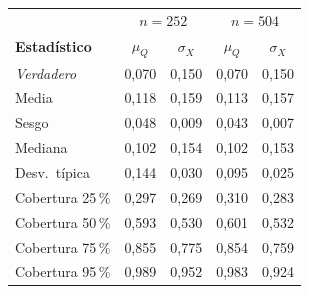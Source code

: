 {\footnotesize
\renewcommand{\arraystretch}{1.18}
\begin{tabular}{l|cc|cc}
\hline
\multicolumn{1}{c}{} & \multicolumn{2}{c}{$n=252$} & \multicolumn{2}{c}{$n=504$} \\
\textbf{Estad\'istico} & $\mu_Q$ & $\sigma_X$ & $\mu_Q$ & $\sigma_X$ \\
\hline
\textit{Verdadero} & 0,070 & 0,150 & 0,070 & 0,150 \\
\hline
Media & 0,118 & 0,159 & 0,113 & 0,157 \\
Sesgo & 0,048 & 0,009 & 0,043 & 0,007 \\
Mediana & 0,102 & 0,154 & 0,102 & 0,153 \\
Desv.\ t\'ipica & 0,144 & 0,030 & 0,095 & 0,025 \\
\hline
Cobertura 25\,\% & 0,297 & 0,269 & 0,310 & 0,283 \\
Cobertura 50\,\% & 0,593 & 0,530 & 0,601 & 0,532 \\
Cobertura 75\,\% & 0,855 & 0,775 & 0,854 & 0,759 \\
Cobertura 95\,\% & 0,989 & 0,952 & 0,983 & 0,924 \\
\hline
\end{tabular}}